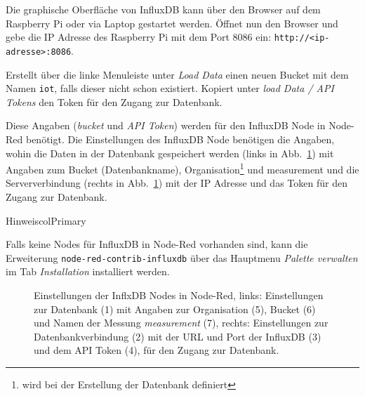 \documentclass[
  11pt,
  a4paperpaper,
  oneside, openany  ,captions=tableheading
]{scrbook}
\theoremstyle{definition}
\theoremstyle{remark}
\begin{document}
Die graphische Oberfläche von InfluxDB kann über den Browser auf dem
Raspberry Pi oder via Laptop gestartet werden. Öffnet nun den Browser
und gebe die IP Adresse des Raspberry Pi mit dem Port 8086 ein:
\texttt{http://\textless{}ip-adresse\textgreater{}:8086}.

Erstellt über die linke Menuleiste unter \emph{Load Data} einen neuen
Bucket mit dem Namen \texttt{iot}, falls dieser nicht schon existiert.
Kopiert unter \emph{load Data / API Tokens} den Token für den Zugang zur
Datenbank.

Diese Angaben (\emph{bucket} und \emph{API Token}) werden für den
InfluxDB Node in Node-Red benötigt. Die Einstellungen des InfluxDB Node
benötigen die Angaben, wohin die Daten in der Datenbank gespeichert
werden (links in Abb.~\ref{fig-noderedinfluxdb}) mit Angaben zum Bucket
(Datenbankname), Organisation\footnote{wird bei der Erstellung der
  Datenbank definiert} und measurement und die Serververbindung (rechts
in Abb.~\ref{fig-noderedinfluxdb}) mit der IP Adresse und das Token für
den Zugang zur Datenbank.

\begin{boxtitle}{Hinweis}{colPrimary}

Falls keine Nodes für InfluxDB in Node-Red vorhanden sind, kann die
Erweiterung \texttt{node-red-contrib-influxdb} über das Hauptmenu
\emph{Palette verwalten} im Tab \emph{Installation} installiert werden.

\end{boxtitle}

\begin{figure}


\caption{\label{fig-noderedinfluxdb}Einstellungen der InflxDB Nodes in
Node-Red, links: Einstellungen zur Datenbank (1) mit Angaben zur
Organisation (5), Bucket (6) und Namen der Messung \emph{measurement}
(7), rechts: Einstellungen zur Datenbankverbindung (2) mit der URL und
Port der InfluxDB (3) und dem API Token (4), für den Zugang zur
Datenbank.}

\end{figure}%
\end{document}
